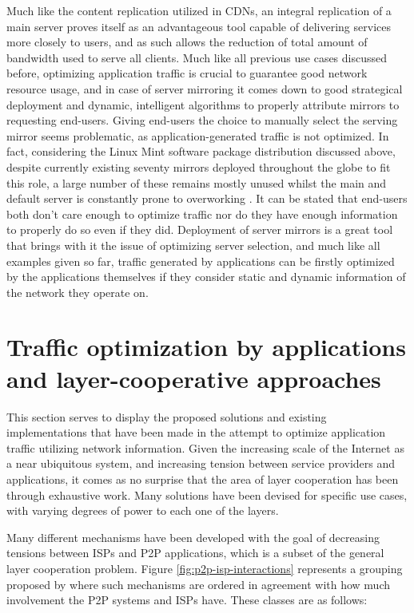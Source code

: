 \documentclass[
  oneside,
  11pt, a4paper,
  footinclude=true,
  headinclude=true,
  cleardoublepage=empty
]{scrbook}
\begin{document}
	Much like the content replication utilized in CDNs, an integral replication of a main server proves itself as an advantageous tool capable of delivering services more closely to users, and as such allows the reduction of total amount of bandwidth used to serve all clients. Much like all previous use cases discussed before, optimizing application traffic is crucial to guarantee good network resource usage, and in case of server mirroring it comes down to good strategical deployment and dynamic, intelligent algorithms to properly attribute mirrors to requesting end-users. Giving end-users the choice to manually select the serving mirror seems problematic, as application-generated traffic is not optimized. In fact, considering the Linux Mint software package distribution discussed above, despite currently existing seventy mirrors deployed throughout the globe to fit this role, a large number of these remains mostly unused whilst the main and default server is constantly prone to overworking \cite{mint-article}. It can be stated that end-users both don't care enough to optimize traffic nor do they have enough information to properly do so even if they did. Deployment of server mirrors is a great tool that brings with it the issue of optimizing server selection, and much like all examples given so far, traffic generated by applications can be firstly optimized by the applications themselves if they consider static and dynamic information of the network they operate on.
	
	\section{Traffic optimization by applications and layer-cooperative approaches}
	
	This section serves to display the proposed solutions and existing implementations that have been made in the attempt to optimize application traffic utilizing network information. Given the increasing scale of the Internet as a near ubiquitous system, and increasing tension between service providers and applications, it comes as no surprise that the area of layer cooperation has been through exhaustive work. Many solutions have been devised for specific use cases, with varying degrees of power to each one of the layers. 
	
	Many different mechanisms have been developed with the goal of decreasing tensions between ISPs and P2P applications, which is a subset of the general layer cooperation problem. Figure \ref{fig:p2p-isp-interactions} represents a grouping proposed by \cite{dan-Commag10} where such mechanisms are ordered in agreement with how much involvement the P2P systems and ISPs have. These classes are as follows:
	
\end{document}
